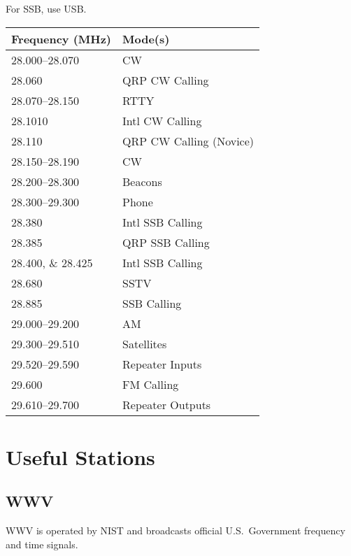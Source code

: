 \documentclass[11pt, onecolumn, table]{article}
\begin{document}
For SSB, use USB.
\begin{center}
  \begin{tabular}{l l}
    {Frequency (\si{\MHz})}			& Mode(s)					\\
    \midrule
    \numrange{28.000}{28.070}		& CW						\\
    \num{28.060}					& QRP CW Calling			\\
    \numrange{28.070}{28.150}		& RTTY						\\
    \num{28.1010}					& Intl CW Calling			\\
    \num{28.110}					& QRP CW Calling (Novice)	\\
    \numrange{28.150}{28.190}		& CW						\\
    \numrange{28.200}{28.300}		& Beacons					\\
    \numrange{28.300}{29.300}		& Phone						\\
    \num{28.380}					& Intl SSB Calling			\\
    \num{28.385}					& QRP SSB Calling			\\
    \numlist{28.400;28.425}			& Intl SSB Calling			\\
    \num{28.680}					& SSTV						\\
    \num{28.885}					& SSB Calling				\\
    \numrange{29.000}{29.200}		& AM						\\
    \numrange{29.300}{29.510}		& Satellites				\\
    \numrange{29.520}{29.590}		& Repeater Inputs			\\
    \num{29.600}					& FM Calling				\\
    \numrange{29.610}{29.700}		& Repeater Outputs			\\
  \end{tabular}
\end{center}

\clearpage
\clearpage


\section{Useful Stations}


\subsection{WWV}
WWV is operated by NIST and broadcasts official U.S.\ Government frequency and time signals.
\end{document}
